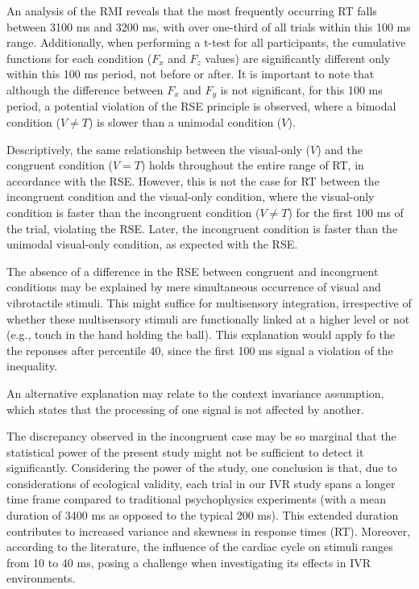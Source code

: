 \documentclass[12pt,oneside,openright]{report}
\begin{document}
An analysis of the RMI reveals that the most frequently occurring RT falls between 3100 ms and 3200 ms, with over one-third of all trials within this 100 ms range. Additionally, when performing a t-test for all participants, the cumulative functions for each condition ($F_x$ and $F_z$ values) are significantly different only within this 100 ms period, not before or after. It is important to note that although the difference between $F_x$ and $F_y$ is not significant, for this 100 ms period, a potential violation of the RSE principle is observed, where a bimodal condition ($V \neq T$) is slower than a unimodal condition ($V$).

Descriptively, the same relationship between the visual-only ($V$) and the congruent condition ($V=T$) holds throughout the entire range of RT, in accordance with the RSE. However, this is not the case for RT between the incongruent condition and the visual-only condition, where the visual-only condition is faster than the incongruent condition ($V \neq T$) for the first 100 ms of the trial, violating the RSE. Later, the incongruent condition is faster than the unimodal visual-only condition, as expected with the RSE.

 The absence of a difference in the RSE between congruent and incongruent conditions may be explained by mere simultaneous occurrence of visual and vibrotactile stimuli. This might suffice for multisensory integration, irrespective of whether these multisensory stimuli are functionally linked at a higher level or not (e.g., touch in the hand holding the ball)\parencite{RSE_FBI}. This explanation would apply fo the the reponses after percentile 40, since the first 100 ms signal a violation of the inequality.

An alternative explanation may relate to the context invariance assumption, which states that the processing of one signal is not affected by another.

The discrepancy observed in the incongruent case may be so marginal that the statistical power of the present study might not be sufficient to detect it significantly. Considering the power of the study, one conclusion is that, due to considerations of ecological validity, each trial in our IVR study spans a longer time frame compared to traditional psychophysics experiments (with a mean duration of 3400 ms as opposed to the typical 200 ms). This extended duration contributes to increased variance and skewness in response times (RT). Moreover, according to the literature, the influence of the cardiac cycle on stimuli ranges from 10 to 40 ms, posing a challenge when investigating its effects in IVR environments.
\end{document}
